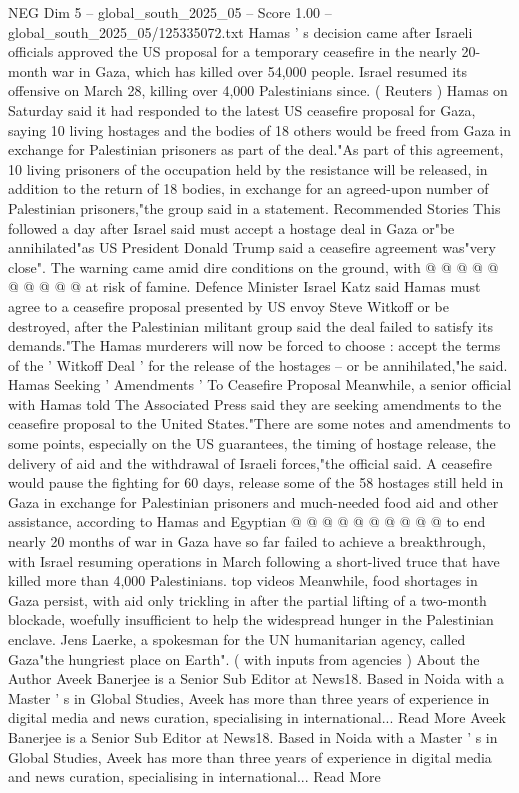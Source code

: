 \begin{textsample}{NEG Dim 5 – global\_south\_2025\_05 – Score 1.00 – global\_south\_2025\_05/125335072.txt}  \label{ex:f5_neg_333}
Hamas ' s decision came after Israeli officials approved the US proposal for a temporary ceasefire in the nearly 20-month war in Gaza, which has killed over 54,000 people.
Israel resumed its offensive on March 28, killing over 4,000 Palestinians since. ( Reuters ) Hamas on Saturday said it had responded to the latest US ceasefire proposal for Gaza, saying 10 living hostages and the bodies of 18 others would be freed from Gaza in exchange for Palestinian prisoners as part of the deal."As part of this agreement, 10 living prisoners of the occupation held by the resistance will be released, in addition to the return of 18 bodies, in exchange for an agreed-upon number of Palestinian prisoners,"the group said in a statement.
Recommended Stories This followed a day after Israel said must accept a hostage deal in Gaza or"be annihilated"as US President Donald Trump said a ceasefire agreement was"very close".
The warning came amid dire conditions on the ground, with @ @ @ @ @ @ @ @ @ @ at risk of famine.
Defence Minister Israel Katz said Hamas must agree to a ceasefire proposal presented by US envoy Steve Witkoff or be destroyed, after the Palestinian militant group said the deal failed to satisfy its demands."The Hamas murderers will now be forced to choose : accept the terms of the ' Witkoff Deal ' for the release of the hostages -- or be annihilated,"he said.
Hamas Seeking ' Amendments ' To Ceasefire Proposal Meanwhile, a senior official with Hamas told The Associated Press said they are seeking amendments to the ceasefire proposal to the United States."There are some notes and amendments to some points, especially on the US guarantees, the timing of hostage release, the delivery of aid and the withdrawal of Israeli forces,"the official said.
A ceasefire would pause the fighting for 60 days, release some of the 58 hostages still held in Gaza in exchange for Palestinian prisoners and much-needed food aid and other assistance, according to Hamas and Egyptian @ @ @ @ @ @ @ @ @ @ to end nearly 20 months of war in Gaza have so far failed to achieve a breakthrough, with Israel resuming operations in March following a short-lived truce that have killed more than 4,000 Palestinians. top videos Meanwhile, food shortages in Gaza persist, with aid only trickling in after the partial lifting of a two-month blockade, woefully insufficient to help the widespread hunger in the Palestinian enclave.
Jens Laerke, a spokesman for the UN humanitarian agency, called Gaza"the hungriest place on Earth". ( with inputs from agencies ) About the Author Aveek Banerjee is a Senior Sub Editor at News18.
Based in Noida with a Master ' s in Global Studies, Aveek has more than three years of experience in digital media and news curation, specialising in international...
Read More Aveek Banerjee is a Senior Sub Editor at News18.
Based in Noida with a Master ' s in Global Studies, Aveek has more than three years of experience in digital media and news curation, specialising in international...
Read More

\end{textsample}
